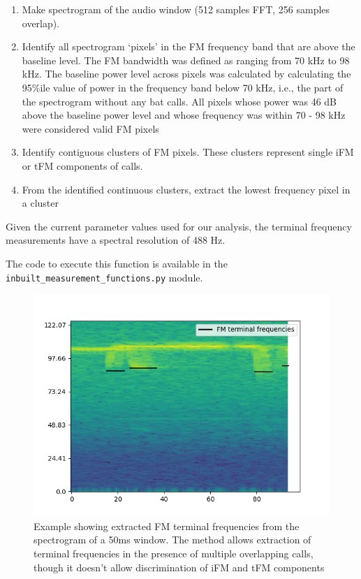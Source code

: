 \documentclass[
]{book}
\providecommand{\tightlist}{%
  \setlength{\itemsep}{0pt}\setlength{\parskip}{0pt}}
\begin{document}
\begin{enumerate}
\def\labelenumi{\arabic{enumi}.}
\tightlist
\item
  Make spectrogram of the audio window (512 samples FFT, 256 samples overlap).
\item
  Identify all spectrogram `pixels' in the FM frequency band that are above the baseline level. The FM bandwidth was defined as ranging from 70 kHz to 98 kHz. The baseline power level across pixels was calculated by calculating the 95\%ile value of power in the frequency band below 70 kHz, i.e., the part of the spectrogram without any bat calls. All pixels whose power was 46 dB above the baseline power level and whose frequency was within 70 - 98 kHz were considered valid FM pixels
\item
  Identify contiguous clusters of FM pixels. These clusters represent single iFM or tFM components of calls.
\item
  From the identified continuous clusters, extract the lowest frequency pixel in a cluster
\end{enumerate}

Given the current parameter values used for our analysis, the terminal frequency measurements have a spectral resolution of 488 Hz.

The code to execute this function is available in the \texttt{inbuilt\_measurement\_functions.py} module.

\begin{figure}
\includegraphics[width=1\linewidth]{original_papers/hbc-paper/figures/fm_terminal_0_matching_annotaudio_Aditya_2018-08-16_2324_231_hp.} \caption{\label{fig:fmterminal}Example showing extracted FM terminal frequencies from the spectrogram of a 50ms window. The method allows extraction of terminal frequencies in the presence of multiple overlapping calls, though it doesn't allow discrimination of iFM and tFM components }\label{fig:fmterminal}
\end{figure}
\end{document}
